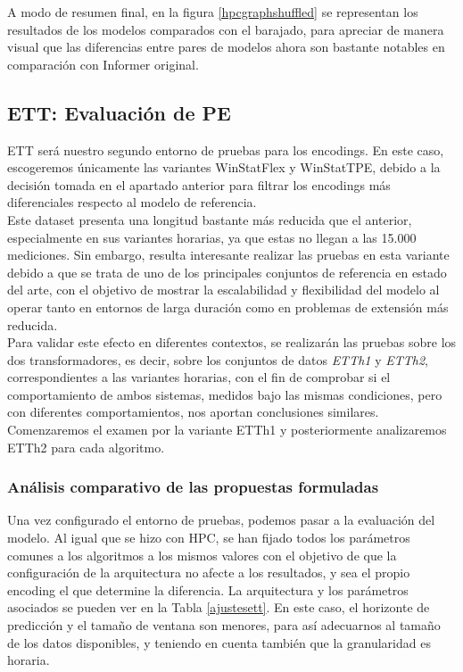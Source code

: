 A modo de resumen final, en la figura \ref{hpcgraphshuffled} se representan los resultados de los modelos comparados con el barajado, para apreciar de manera visual que las diferencias entre pares de modelos ahora son bastante notables en comparación con Informer original.


\subsection{ETT: Evaluación de PE}

ETT será nuestro segundo entorno de pruebas para los encodings. En este caso, escogeremos únicamente las variantes WinStatFlex y WinStatTPE, debido a la decisión tomada en el apartado anterior para filtrar los encodings más diferenciales respecto al modelo de referencia. \\

Este dataset presenta una longitud bastante más reducida que el anterior, especialmente en sus variantes horarias, ya que estas no llegan a las 15.000 mediciones. Sin embargo, resulta interesante realizar las pruebas en esta variante debido a que se trata de uno de los principales conjuntos de referencia en estado del arte, con el objetivo de mostrar la escalabilidad y flexibilidad del modelo al operar tanto en entornos de larga duración como en problemas de extensión más reducida.\\

 Para validar este efecto en diferentes contextos, se realizarán las pruebas sobre los dos transformadores, es decir, sobre los conjuntos de datos \textit{ETTh1} y \textit{ETTh2}, correspondientes a las variantes horarias, con el fin de comprobar si el comportamiento de ambos sistemas, medidos bajo las mismas condiciones, pero con diferentes comportamientos, nos aportan conclusiones similares. Comenzaremos el examen por la variante ETTh1 y posteriormente analizaremos ETTh2 para cada algoritmo.


\subsubsection{Análisis comparativo de las propuestas formuladas}


Una vez configurado el entorno de pruebas, podemos pasar a la evaluación del modelo. Al igual que se hizo con HPC, se han fijado todos los parámetros comunes a los algoritmos a los mismos valores con el objetivo de que la configuración de la arquitectura no afecte a los resultados, y sea el propio encoding el que determine la diferencia. La arquitectura y los parámetros asociados se pueden ver en la Tabla \ref{ajustesett}. En este caso, el horizonte de predicción y el tamaño de ventana son menores, para así adecuarnos al tamaño de los datos disponibles, y teniendo en cuenta también que la granularidad es horaria.

